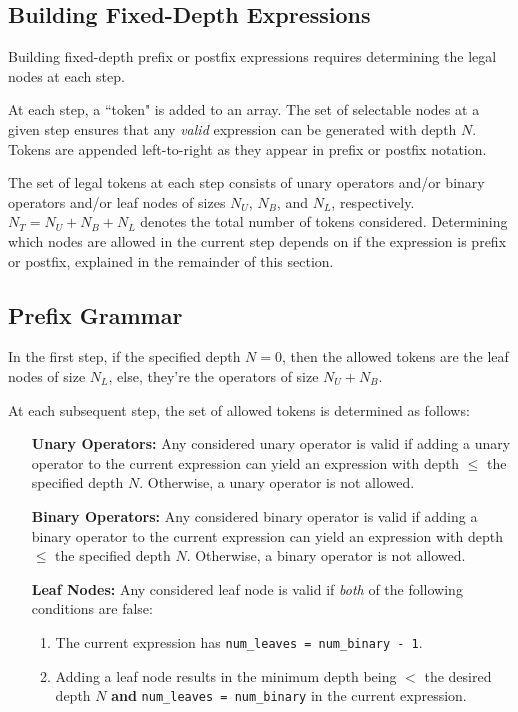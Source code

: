 \documentclass[runningheads]{llncs}
\begin{document}
\subsection{Building Fixed-Depth Expressions}
Building fixed-depth prefix or postfix expressions requires determining the legal nodes at each step. 
\par At each step, a ``token" is added to an array. The set of selectable nodes at a given step ensures that any \emph{valid} expression can be generated with depth $N$. Tokens are appended left-to-right as they appear in prefix or postfix notation. 
\par The set of legal tokens at each step consists of unary operators and/or binary operators and/or leaf nodes of sizes $N_U$, $N_B$, and  $N_L$, respectively. $N_{T} = N_U + N_B + N_L$ denotes the total number of tokens considered. Determining which nodes are allowed in the current step depends on if the expression is prefix or postfix, explained in the remainder of this section.
\subsection{Prefix Grammar}\label{subsec:prefix_grammar}
In the first step, if the specified depth $N=0$, then the allowed tokens are the leaf nodes of size $N_L$, else, they're the operators of size $N_U + N_B$.
\par At each subsequent step, the set of allowed tokens is determined as follows:
\begin{itemize}
    \item[\textbf{Unary Operators:}]
    Any considered unary operator is valid if adding a unary operator to the current expression can yield an expression with depth $\leq$ the specified depth $N$. Otherwise, a unary operator is not allowed.
    \item[\textbf{Binary Operators:}]
    Any considered binary operator is valid if adding a binary operator to the current expression can yield an expression with depth $\leq$ the specified depth $N$. Otherwise, a binary operator is not allowed.
    \item[\textbf{Leaf Nodes:}]
    Any considered leaf node is valid if \emph{both} of the following conditions are false:
    \begin{enumerate}
    \item The current expression has \texttt{num\_leaves = num\_binary - 1}.
    \item Adding a leaf node results in the minimum depth being $<$ the desired depth $N$ \textbf{and} \texttt{num\_leaves = num\_binary} in the current expression.
    \end{enumerate}
\end{itemize}
\end{document}
